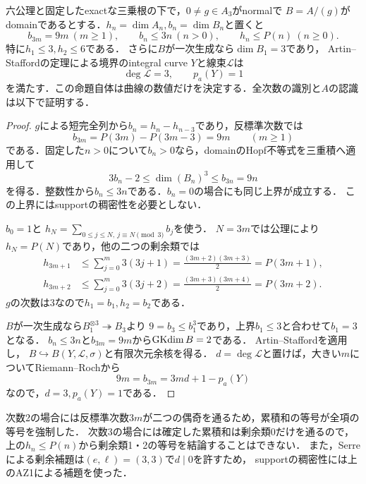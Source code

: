 \documentclass[11pt,a4paper]{ltjsarticle}
\begin{document}
\begin{proposition}[三次の整なnormal切断のHilbert上界]\label{prop:cubic-normal-hilbert-bound}
六公理と固定したexactな三乗根の下で，$0\ne g\in A_3$がnormalで
$B=A/(g)$がdomainであるとする．$h_n=\dim A_n,b_n=\dim B_n$と置くと
\[
 b_{3m}=9m\ (m\geq1),\qquad b_n\leq3n\ (n>0),\qquad
 h_n\leq P(n)\ (n\geq0).
\]
特に$h_1\leq3,h_2\leq6$である．
さらに$B$が一次生成なら$\dim B_1=3$であり，
Artin--Staffordの定理による境界のintegral curve $Y$と線束$\mathcal L$は
\[
 \deg\mathcal L=3,\qquad p_a(Y)=1
\]
を満たす．この命題自体は曲線の数値だけを決定する．全次数の識別と$A$の認識は以下で証明する．
\end{proposition}
\begin{proof}
$g$による短完全列から$b_n=h_n-h_{n-3}$であり，反標準次数では
\[
 b_{3m}=P(3m)-P(3m-3)=9m\qquad(m\geq1)
\]
である．固定した$n>0$について$b_n>0$なら，domainのHopf不等式を三重積へ適用して
\[
 3b_n-2\leq\dim(B_n)^3\leq b_{3n}=9n
\]
を得る．整数性から$b_n\leq3n$である．$b_n=0$の場合にも同じ上界が成立する．
この上界にはsupportの稠密性を必要としない．

$b_0=1$と
$h_N=\sum_{0\leq j\leq N,\ j\equiv N\pmod3}b_j$を使う．
$N=3m$では公理により$h_N=P(N)$であり，他の二つの剰余類では
\begin{align*}
 h_{3m+1}&\leq\sum_{j=0}^m3(3j+1)
       =\frac{(3m+2)(3m+3)}2=P(3m+1),\\
 h_{3m+2}&\leq\sum_{j=0}^m3(3j+2)
       =\frac{(3m+3)(3m+4)}2=P(3m+2).
\end{align*}
$g$の次数は3なので$h_1=b_1,h_2=b_2$である．

$B$が一次生成なら$B_1^{\otimes3}\twoheadrightarrow B_3$より
$9=b_3\leq b_1^3$であり，上界$b_1\leq3$と合わせて$b_1=3$となる．
$b_n\leq3n$と$b_{3m}=9m$から$\operatorname{GKdim} B=2$である．
Artin--Stafford\cite[Theorem 0.2]{ASquadratic}を適用し，
$B\hookrightarrow B(Y,\mathcal L,\sigma)$と有限次元余核を得る．
$d=\deg\mathcal L$と置けば，大きい$m$についてRiemann--Rochから
\[
 9m=b_{3m}=3md+1-p_a(Y)
\]
なので，$d=3,p_a(Y)=1$である．
\end{proof}

\begin{remark}[残る二つの剰余類]
次数2の場合には反標準次数$3m$が二つの偶奇を通るため，累積和の等号が全項の等号を強制した．
次数3の場合には確定した累積和は剰余類0だけを通るので，
上の$h_n\leq P(n)$から剰余類1・2の等号を結論することはできない．
また，Serreによる剰余補題は$(e,\ell)=(3,3)$で$d\mid0$を許すため，
supportの稠密性には上のAZ1による補題を使った．
\end{remark}
\end{document}
